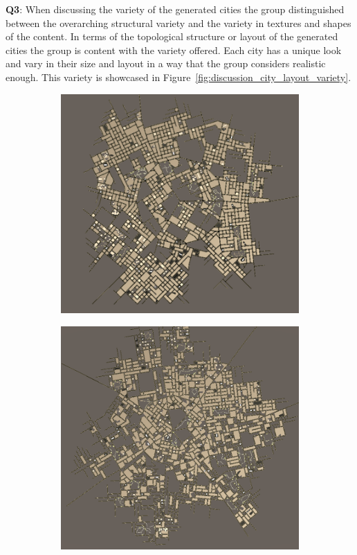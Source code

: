 \textbf{Q3}:
When discussing the variety of the generated cities the group distinguished between the overarching structural variety and the variety in textures and shapes of the content.
In terms of the topological structure or layout of the generated cities the group is content with the variety offered.
Each city has a unique look and vary in their size and layout in a way that the group considers realistic enough.
This variety is showcased in Figure~\ref{fig:discussion_city_layout_variety}.

\begin{figure}[h!]
  \centering
  \begin{subfigure}[b]{0.455\textwidth}
    \includegraphics[width=\textwidth]{figure/discussion_city_layout_1}
  \end{subfigure}
  \quad
  \begin{subfigure}[b]{0.45\textwidth}
    \includegraphics[width=\textwidth]{figure/discussion_city_layout_2}

\end{subfigure}
\end{figure}
